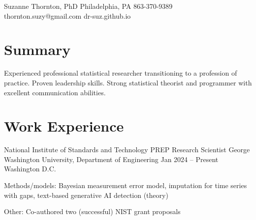 \documentclass[letterpaper]{resume_config}
\begin{document}
\Header
    {Suzanne Thornton, PhD}  
    {Philadelphia, PA} 
    {863-370-9389}  
    {thornton.suzy@gmail.com} 
    {dr-suz.github.io} \

\section{Summary}
Experienced professional statistical researcher transitioning to a profession of practice. Proven leadership skills. Strong statistical theorist and programmer with excellent communication abilities. %


\section{Work Experience}
\WorkExperience
    {National Institute of Standards and Technology PREP Research Scientist}  
    {George Washington University, Department of Engineering}  
    {Jan 2024 -- Present}  
    {Washington D.C.}  
    {
        \item Methods/models: Bayesian measurement error model, imputation for time series with gaps, text-based generative AI detection (theory)
        \item Other: Co-authored two (successful) NIST grant proposals 
    } 
\end{document}
